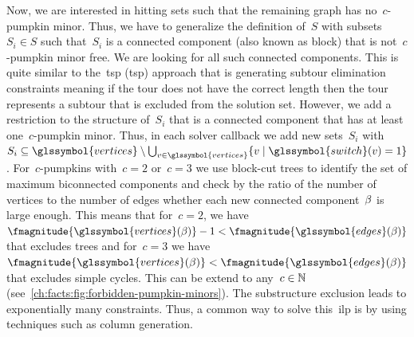 Now, we are interested in hitting sets such that the remaining graph has
no~$c$-pumpkin minor. Thus, we have to generalize the definition of~$S$ with
subsets~$S_i\in S$ such that~$S_i$ is a connected component (also known as
block) that is not~$c$-pumpkin minor free. We are looking for all such connected
components. This is quite similar to the~\acrlong{tsp} (\gls{tsp}) approach that
is generating subtour elimination constraints meaning if the tour does not have
the correct length then the tour represents a subtour that is excluded from the
solution set. However, we add a restriction to the structure of~$S_i$ that is a
connected component that has at least one~$c$-pumpkin minor. Thus, in each
solver callback we add new sets~$S_i$ with~$ S_i
\subseteq
\glssymbol{vertices}
\setminus
\bigcup_{\vertex\in\glssymbol{vertices}}
\{\vertex
\mid
\glssymbol{switch}(\vertex)=1
\}$. For~$c$-pumpkins with~$c = 2$ or~$c = 3$ we use block-cut trees to identify
the set of maximum biconnected components and check by the ratio of the number
of vertices to the number of edges whether each new connected component~$\beta$
is large enough. This means that for~$c = 2$, we have~$\fmagnitude{
\glssymbol{vertices} (\block)}-1 <
\fmagnitude{\glssymbol{edges}(\block)}$ that excludes trees and for~$c = 3$ we
have~$
\fmagnitude{\glssymbol{vertices}(\block)} 
<
\fmagnitude{\glssymbol{edges}(\block)}
$ that excludes simple cycles. This can be extend to any~$c\in\mathbb{N}$
(see~\cref{ch:facts:fig:forbidden-pumpkin-minors}).
%
%     
% 
The substructure exclusion leads to exponentially many constraints. Thus, a
common way to solve this~\gls{ilp} is by using techniques such as column
generation.
% 
%
